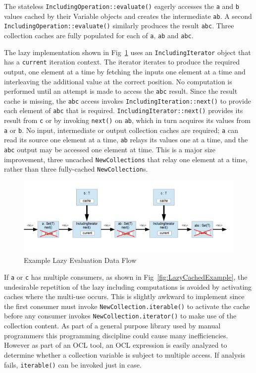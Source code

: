 \documentclass{llncs}
\begin{document}
The stateless \verb$IncludingOperation::evaluate()$ eagerly accesses the \verb$a$ and \verb$b$ values cached by their Variable objects and creates the intermediate \verb$ab$. A second \verb$IncludingOperation::evaluate()$ similarly produces the result \verb$abc$. Three collection caches are fully populated for each of \verb$a$, \verb$ab$ and \verb$abc$.

The lazy implementation shown in Fig~\ref{fig:LazyExample} uses an \verb$IncludingIterator$ object that has a \verb$current$ iteration context. The iterator iterates to produce the required output, one element at a time by fetching the inputs one element at a time and interleaving the additional value at the correct position. No computation is performed until an attempt is made to access the \verb$abc$ result. Since the result cache is missing, the \verb$abc$ access invokes \verb$IncludingIteration::next()$ to provide each element of \verb$abc$ that is required. \verb$IncludingIterator::next()$ provides its result from \verb$c$ or by invoking \verb$next()$ on \verb$ab$, which in turn acquires its values from \verb$a$ or \verb$b$. No input, intermediate or output collection caches are required; \verb$a$ can read its source one element at a time, \verb$ab$ relays its values one at a time, and the \verb$abc$ output may be accessed one element at time. This is a major size improvement, three uncached \verb$NewCollections$ that relay one element at a time, rather than three fully-cached \verb$NewCollection$s.

\begin{figure}
	\begin{center}
		\includegraphics[width=4.5in]{LazyExample.png}
	\end{center}
	\caption{Example Lazy Evaluation Data Flow}
	\label{fig:LazyExample}
\end{figure}

If \verb$a$ or \verb$c$ has multiple consumers, as shown in Fig~\ref{fig:LazyCachedExample}, the undesirable repetition of the lazy including computations is avoided by activating caches where the multi-use occurs. This is slightly awkward to implement since the first consumer must invoke \verb$NewCollection.iterable()$ to activate the cache before any consumer invokes \verb$NewCollection.iterator()$ to make use of the collection content. As part of a general purpose library used by manual programmers this programming discipline could cause many inefficiencies. However as part of an OCL tool, an OCL expression is easily analyzed to determine whether a collection variable is subject to multiple access. If analysis fails, \verb$iterable()$ can be invoked just in case.
\end{document}
